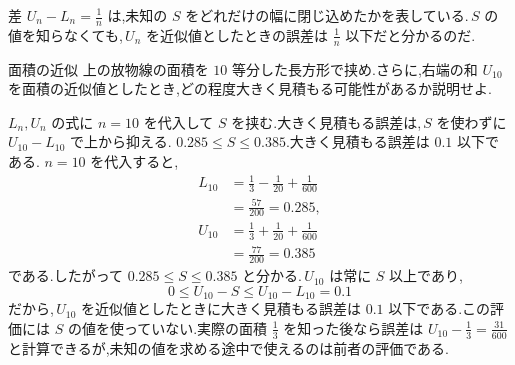 差 $U_n-L_n=\frac1n$ は,未知の $S$ をどれだけの幅に閉じ込めたかを表している.\,$S$ の値を知らなくても,\,$U_n$ を近似値としたときの誤差は $\frac1n$ 以下だと分かるのだ.

\begin{example}{面積の近似}
上の放物線の面積を $10$ 等分した長方形で挟め.さらに,右端の和 $U_{10}$ を面積の近似値としたとき,どの程度大きく見積もる可能性があるか説明せよ.
\end{example}
$L_n,U_n$ の式に $n=10$ を代入して $S$ を挟む.大きく見積もる誤差は,\,$S$ を使わずに $U_{10}-L_{10}$ で上から抑える.
$0.285\le S\le0.385$.大きく見積もる誤差は $0.1$ 以下である.
$n=10$ を代入すると,
\begin{align*}
 L_{10}&=\frac13-\frac1{20}+\frac1{600}\\
 &=\frac{57}{200}=0.285,\\
 U_{10}&=\frac13+\frac1{20}+\frac1{600}\\
 &=\frac{77}{200}=0.385
\end{align*}
である.したがって $0.285\le S\le0.385$ と分かる.\,$U_{10}$ は常に $S$ 以上であり,
\[
 0\le U_{10}-S\le U_{10}-L_{10}=0.1
\]
だから,\,$U_{10}$ を近似値としたときに大きく見積もる誤差は $0.1$ 以下である.この評価には $S$ の値を使っていない.実際の面積 $\frac13$ を知った後なら誤差は $U_{10}-\frac13=\frac{31}{600}$ と計算できるが,未知の値を求める途中で使えるのは前者の評価である.
